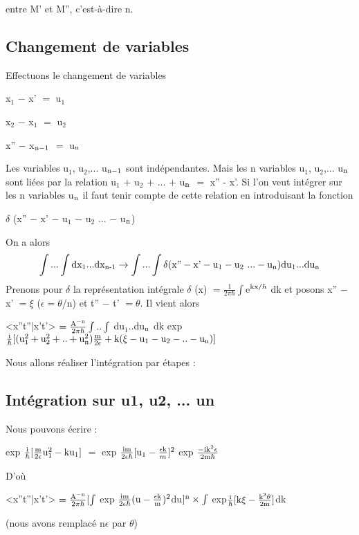 entre M' et M'', c'est-à-dire n.

\subsection{Changement de variables}

Effectuons le changement de variables

x$_1$ $-$ x' $=$ u$_1$

x$_2$ $-$ x$_1$ $=$ u$_2$

x'' $-$ x$_{\text{n}-1}$ $=$ u$_{\text{n}}$


Les variables u$_1$, u$_2$,... u$_{\text{n}-1}$ sont indépendantes. Mais les
n variables u$_1$, u$_2$,... u$_{\text{n}}$ sont liées par la relation
u$_1$ $+$ u$_2$ $+$ ... $+$ u$_{\text{n}}$ $=$ x'' - x'. Si l'on veut intégrer sur les n variables u$_{\text{n}}$ il faut tenir compte
de cette relation en introduisant la fonction
\begin{center}
$\delta$ (x'' $-$ x' $-$ u$_1$ $-$ u$_2$ ... $-$ u$_{\text{n}}$)
\end{center}
On a alors
\[
\int...\int \text{dx}_1...\text{dx}_{\text{n-1}} \to \int...\int
 \delta (\text{x''} - \text{x'} - \text{u}_1 - \text{u}_2 \ ... - \text{u}_{\text{n}})
\text{du}_1...\text{du}_{\text{n}}
\]
Prenons pour $\delta$ la représentation intégrale
$\delta$ (x) $=\frac{1}{2\pi\hbar}\int$e$^{\text{kx/}\hbar}$   dk
et posons x'' $-$ x' $=\xi$ ($\epsilon=\theta$/n) et
t'' $-$ t' $=\theta$.
Il vient alors
\begin{center}
<x''t''|x't'> $=\frac{\text{A}^{-\text{n}}}{2\pi\hbar} \int..\int$ du$_1$..du$_{\text{n}}$
dk exp $\frac{\text{i}}{\hbar}[(\text{u}_1^2+\text{u}_2^2+..+\text{u}_{\text{n}}^2)\frac{\text{m}}{2\epsilon}
+\text{k}(\xi-\text{u}_1-\text{u}_2-..-\text{u}_{\text{n}})]$
\end{center}
Nous allons réaliser l'intégration par étapes :
\subsection{Intégration sur u1, u2, ... un}
Nous pouvons écrire :
\begin{center}
exp $\frac{\text{i}}{\hbar}[\frac{\text{m}}{2\epsilon}\text{u}_1^2-\text{ku}_1]$ $=$
exp $\frac{\text{im}}{2\epsilon\hbar}[\text{u}_1-\frac{\epsilon\text{k}}{m}]^2$
exp $\frac{-\text{ik}^2\epsilon}{2\text{m}\hbar}$
\end{center}
D'où
\begin{center}
<x''t''|x't'> $=\frac{\text{A}^{-\text{n}}}{2\pi\hbar} [ \int$
exp $\frac{\text{im}}{2\epsilon\hbar}(\text{u}-\frac{\epsilon\text{k}}{\text{m}})^2 $du$]^{\text{n}}
\times \int$  exp$\frac{\text{i}}{\hbar}[\text{k}\xi-\frac{\text{k}^2\theta}{2\text{m}}]$dk 
\end{center}
(nous avons remplacé n$\epsilon$ par $\theta$)

